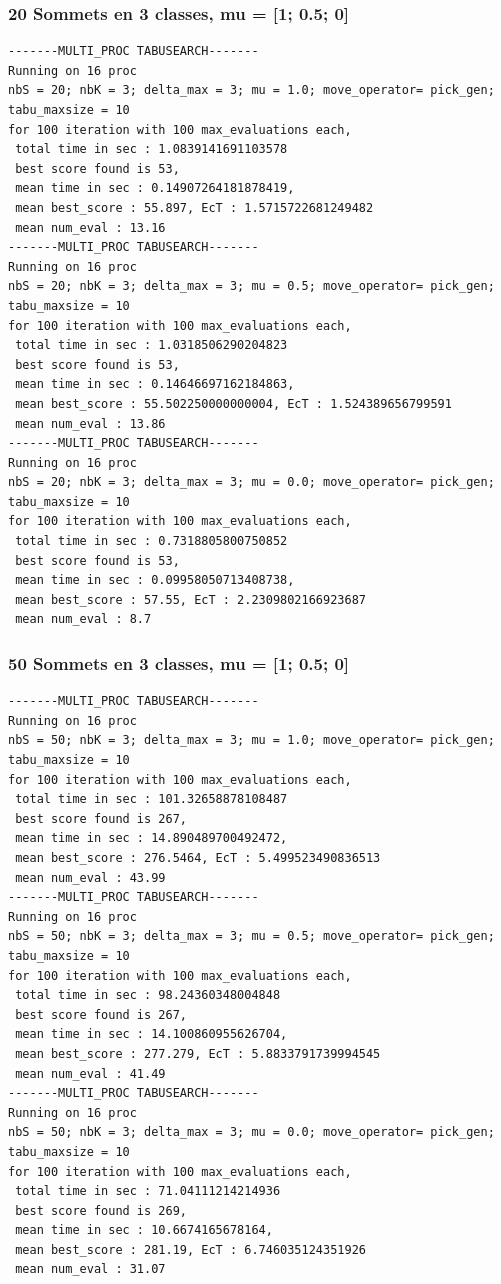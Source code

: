 \documentclass[a4paper]{article}
\begin{document}
\subsubsection{20 Sommets en 3 classes, mu = [1; 0.5; 0]}
\begin{verbatim}
-------MULTI_PROC TABUSEARCH-------
Running on 16 proc
nbS = 20; nbK = 3; delta_max = 3; mu = 1.0; move_operator= pick_gen;
tabu_maxsize = 10
for 100 iteration with 100 max_evaluations each, 
 total time in sec : 1.0839141691103578
 best score found is 53,
 mean time in sec : 0.14907264181878419,
 mean best_score : 55.897, EcT : 1.5715722681249482
 mean num_eval : 13.16
-------MULTI_PROC TABUSEARCH-------
Running on 16 proc
nbS = 20; nbK = 3; delta_max = 3; mu = 0.5; move_operator= pick_gen;
tabu_maxsize = 10
for 100 iteration with 100 max_evaluations each, 
 total time in sec : 1.0318506290204823
 best score found is 53,
 mean time in sec : 0.14646697162184863,
 mean best_score : 55.502250000000004, EcT : 1.524389656799591
 mean num_eval : 13.86
-------MULTI_PROC TABUSEARCH-------
Running on 16 proc
nbS = 20; nbK = 3; delta_max = 3; mu = 0.0; move_operator= pick_gen;
tabu_maxsize = 10
for 100 iteration with 100 max_evaluations each, 
 total time in sec : 0.7318805800750852
 best score found is 53,
 mean time in sec : 0.09958050713408738,
 mean best_score : 57.55, EcT : 2.2309802166923687
 mean num_eval : 8.7
\end{verbatim}
\subsubsection{50 Sommets en 3 classes, mu = [1; 0.5; 0]}
\begin{verbatim}
-------MULTI_PROC TABUSEARCH-------
Running on 16 proc
nbS = 50; nbK = 3; delta_max = 3; mu = 1.0; move_operator= pick_gen; tabu_maxsize = 10
for 100 iteration with 100 max_evaluations each, 
 total time in sec : 101.32658878108487
 best score found is 267,
 mean time in sec : 14.890489700492472,
 mean best_score : 276.5464, EcT : 5.499523490836513
 mean num_eval : 43.99
-------MULTI_PROC TABUSEARCH-------
Running on 16 proc
nbS = 50; nbK = 3; delta_max = 3; mu = 0.5; move_operator= pick_gen; tabu_maxsize = 10
for 100 iteration with 100 max_evaluations each, 
 total time in sec : 98.24360348004848
 best score found is 267,
 mean time in sec : 14.100860955626704,
 mean best_score : 277.279, EcT : 5.8833791739994545
 mean num_eval : 41.49
-------MULTI_PROC TABUSEARCH-------
Running on 16 proc
nbS = 50; nbK = 3; delta_max = 3; mu = 0.0; move_operator= pick_gen; tabu_maxsize = 10
for 100 iteration with 100 max_evaluations each, 
 total time in sec : 71.04111214214936
 best score found is 269,
 mean time in sec : 10.6674165678164,
 mean best_score : 281.19, EcT : 6.746035124351926
 mean num_eval : 31.07
\end{verbatim}
\end{document}

